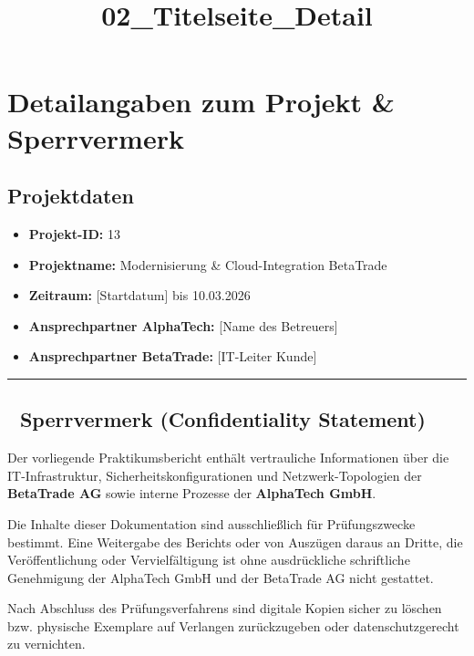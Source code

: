 \documentclass[
]{article}
\title{02\_Titelseite\_Detail}
\author{}
\date{}
\providecommand{\tightlist}{%
  \setlength{\itemsep}{0pt}\setlength{\parskip}{0pt}}
\begin{document}
\maketitle

\section{Detailangaben zum Projekt \&
Sperrvermerk}\label{detailangaben-zum-projekt-sperrvermerk}

\subsection{Projektdaten}\label{projektdaten}

\begin{itemize}
\tightlist
\item
  \textbf{Projekt-ID:} 13
\item
  \textbf{Projektname:} Modernisierung \& Cloud-Integration BetaTrade
\item
  \textbf{Zeitraum:} {[}Startdatum{]} bis 10.03.2026
\item
  \textbf{Ansprechpartner AlphaTech:} {[}Name des Betreuers{]}
\item
  \textbf{Ansprechpartner BetaTrade:} {[}IT-Leiter Kunde{]}
\end{itemize}

\begin{center}\rule{0.5\linewidth}{0.5pt}\end{center}

\subsection{🚫 Sperrvermerk (Confidentiality
Statement)}\label{sperrvermerk-confidentiality-statement}

Der vorliegende Praktikumsbericht enthält vertrauliche Informationen
über die IT-Infrastruktur, Sicherheitskonfigurationen und
Netzwerk-Topologien der \textbf{BetaTrade AG} sowie interne Prozesse der
\textbf{AlphaTech GmbH}.

Die Inhalte dieser Dokumentation sind ausschließlich für Prüfungszwecke
bestimmt. Eine Weitergabe des Berichts oder von Auszügen daraus an
Dritte, die Veröffentlichung oder Vervielfältigung ist ohne
ausdrückliche schriftliche Genehmigung der AlphaTech GmbH und der
BetaTrade AG nicht gestattet.

Nach Abschluss des Prüfungsverfahrens sind digitale Kopien sicher zu
löschen bzw. physische Exemplare auf Verlangen zurückzugeben oder
datenschutzgerecht zu vernichten.
\end{document}
